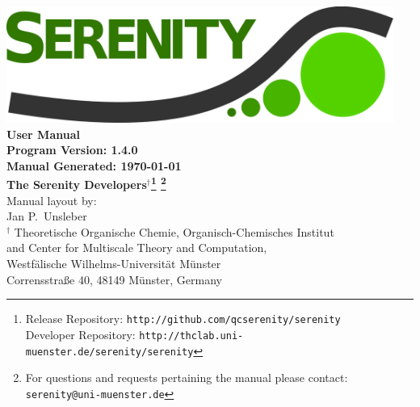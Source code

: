 \documentclass[bibliography=totocnumbered,a4paper,10pt,oneside]{scrbook}
\begin{document}
\thispagestyle{empty}
\begin{center}
\vspace*{1cm}
\includegraphics[width=0.95\textwidth]{./figs/SerenityLogo.png}\\
\vspace{2cm}
{\LARGE\textbf{
User Manual
}}\\
\vspace{1cm}
{\large\textbf{
Program Version: 1.4.0\\
Manual Generated: \today
}}\\
\vspace{2cm}
{\large\textbf{
The Serenity Developers$^{\dagger}$\footnote{Release Repository: \texttt{http://github.com/qcserenity/serenity}\\
                                             Developer Repository: \texttt{http://thclab.uni-muenster.de/serenity/serenity}}
\footnote{For questions and requests pertaining the manual please contact:\\ \texttt{serenity@uni-muenster.de}}
}}\\
\vspace{2cm}
{\large Manual layout by: \\
Jan P.\ Unsleber
}
\\[2ex]

$^{\dagger}$ Theoretische Organische Chemie,
Organisch-Chemisches Institut \\
and Center for Multiscale Theory and Computation,\\
Westf\"alische Wilhelms-Universit\"at M\"unster\\
Corrensstra{\ss}e 40, 48149 M\"unster, Germany\\[2ex]

\vfill
\end{center}
\newpage
{}
\setcounter{page}{1}
\tableofcontents

\newpage
{}
\setcounter{page}{1}
\end{document}
